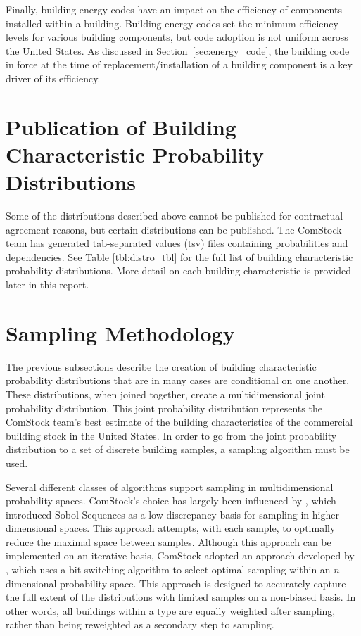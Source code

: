 Finally, building energy codes have an impact on the efficiency of components installed within a building. Building energy codes set the minimum efficiency levels for various building components, but code adoption is not uniform across the United States. As discussed in Section~\ref{sec:energy_code}, the building code in force at the time of replacement/installation of a building component is a key driver of its efficiency.

\section{Publication of Building Characteristic Probability Distributions}
Some of the distributions described above cannot be published for contractual agreement reasons, but certain distributions can be published. The ComStock team has generated tab-separated values (tsv) files containing probabilities and dependencies. See Table \ref{tbl:distro_tbl} for the full list of building characteristic probability distributions. More detail on each building characteristic is provided later in this report.



\section{Sampling Methodology}
The previous subsections describe the creation of building characteristic probability distributions that are in many cases are conditional on one another. These  distributions, when joined together, create a multidimensional joint probability distribution. This joint probability distribution represents the ComStock team's best estimate of the building characteristics of the commercial building stock in the United States. In order to go from the joint probability distribution to a set of discrete building samples, a sampling algorithm must be used.

Several different classes of algorithms support sampling in multidimensional probability spaces. ComStock's choice has largely been influenced by \cite{sobol_sampling}, which introduced Sobol Sequences as a low-discrepancy basis for sampling in higher-dimensional spaces. This approach attempts, with each sample, to optimally reduce the maximal space between samples. Although this approach can be implemented on an iterative basis, ComStock adopted an approach developed by \cite{sobol_lib}, which uses a bit-switching algorithm to select optimal sampling within an $n$-dimensional probability space. This approach is designed to accurately capture the full extent of the distributions with limited samples on a non-biased basis. In other words, all buildings within a type are equally weighted after sampling, rather than being reweighted as a secondary step to sampling.

